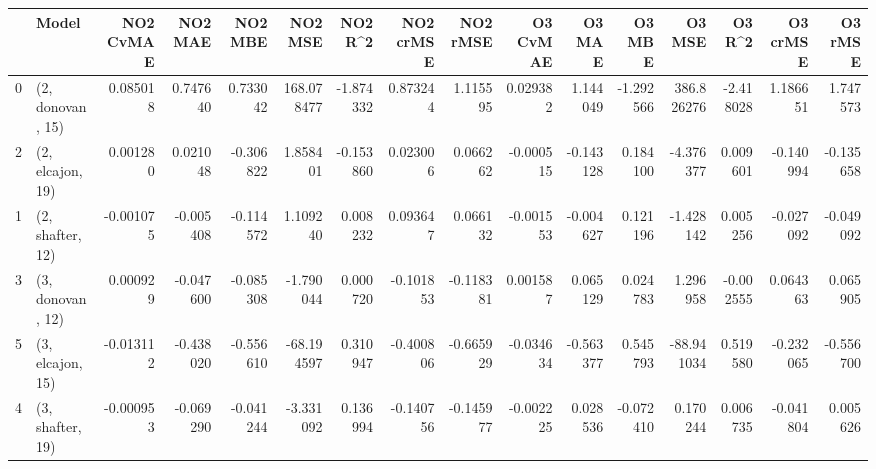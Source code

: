 \begin{tabular}{llrrrrrrrrrrrrrr}
\toprule
{} &             Model &  NO2 CvMAE &   NO2 MAE &   NO2 MBE &     NO2 MSE &   NO2 R\textasciicircum2 &  NO2 crMSE &  NO2 rMSE &  O3 CvMAE &    O3 MAE &    O3 MBE &      O3 MSE &    O3 R\textasciicircum2 &  O3 crMSE &   O3 rMSE \\
\midrule
0 &  (2, donovan, 15) &   0.085018 &  0.747640 &  0.733042 &  168.078477 & -1.874332 &   0.873244 &  1.115595 &  0.029382 &  1.144049 & -1.292566 &  386.826276 & -2.418028 &  1.186651 &  1.747573 \\
2 &  (2, elcajon, 19) &   0.001280 &  0.021048 & -0.306822 &    1.858401 & -0.153860 &   0.023006 &  0.066262 & -0.000515 & -0.143128 &  0.184100 &   -4.376377 &  0.009601 & -0.140994 & -0.135658 \\
1 &  (2, shafter, 12) &  -0.001075 & -0.005408 & -0.114572 &    1.109240 &  0.008232 &   0.093647 &  0.066132 & -0.001553 & -0.004627 &  0.121196 &   -1.428142 &  0.005256 & -0.027092 & -0.049092 \\
3 &  (3, donovan, 12) &   0.000929 & -0.047600 & -0.085308 &   -1.790044 &  0.000720 &  -0.101853 & -0.118381 &  0.001587 &  0.065129 &  0.024783 &    1.296958 & -0.002555 &  0.064363 &  0.065905 \\
5 &  (3, elcajon, 15) &  -0.013112 & -0.438020 & -0.556610 &  -68.194597 &  0.310947 &  -0.400806 & -0.665929 & -0.034634 & -0.563377 &  0.545793 &  -88.941034 &  0.519580 & -0.232065 & -0.556700 \\
4 &  (3, shafter, 19) &  -0.000953 & -0.069290 & -0.041244 &   -3.331092 &  0.136994 &  -0.140756 & -0.145977 & -0.002225 &  0.028536 & -0.072410 &    0.170244 &  0.006735 & -0.041804 &  0.005626 \\
\bottomrule
\end{tabular}
